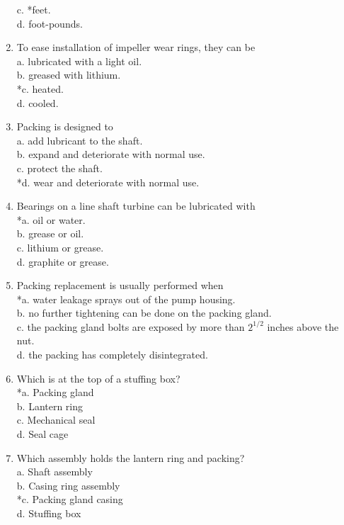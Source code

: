 \begin{enumerate}[1.]
c. *feet.\\
d. foot-pounds.\\
\item To ease installation of impeller wear rings, they can be\\
a. lubricated with a light oil.\\
b. greased with lithium.\\
*c. heated.\\
d. cooled.\\
\item Packing is designed to\\
a. add lubricant to the shaft.\\
b. expand and deteriorate with normal use.\\
c. protect the shaft.\\
*d. wear and deteriorate with normal use.\\
\item Bearings on a line shaft turbine can be lubricated with\\
*a. oil or water.\\
b. grease or oil.\\
c. lithium or grease.\\
d. graphite or grease.\\
\item Packing replacement is usually performed when\\
*a. water leakage sprays out of the pump housing.\\
b. no further tightening can be done on the packing gland.\\
c. the packing gland bolts are exposed by more than $2^{1 / 2}$ inches above the nut.\\
d. the packing has completely disintegrated.\\
\item Which is at the top of a stuffing box?\\
*a. Packing gland\\
b. Lantern ring\\
c. Mechanical seal\\
d. Seal cage\\
\item Which assembly holds the lantern ring and packing?\\
a. Shaft assembly\\
b. Casing ring assembly\\
*c. Packing gland casing\\
d. Stuffing box\\

\end{enumerate}
